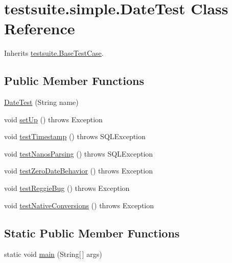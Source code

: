\hypertarget{classtestsuite_1_1simple_1_1_date_test}{}\section{testsuite.\+simple.\+Date\+Test Class Reference}
\label{classtestsuite_1_1simple_1_1_date_test}


Inherits \mbox{\hyperlink{classtestsuite_1_1_base_test_case}{testsuite.\+Base\+Test\+Case}}.

\subsection*{Public Member Functions}
\begin{DoxyCompactItemize}
\item 
\mbox{\hyperlink{classtestsuite_1_1simple_1_1_date_test_a60a505c566e773c02bbbb3110db9f086}{Date\+Test}} (String name)
\item 
void \mbox{\hyperlink{classtestsuite_1_1simple_1_1_date_test_a647fe9ec63530089f263b6e3b11c9416}{set\+Up}} ()  throws Exception 
\item 
void \mbox{\hyperlink{classtestsuite_1_1simple_1_1_date_test_ad5650d68e2ad8f8299ee50582df96fbd}{test\+Timestamp}} ()  throws S\+Q\+L\+Exception 
\item 
void \mbox{\hyperlink{classtestsuite_1_1simple_1_1_date_test_a8ff33660e5f3bef72c6e40dafff29179}{test\+Nanos\+Parsing}} ()  throws S\+Q\+L\+Exception 
\item 
void \mbox{\hyperlink{classtestsuite_1_1simple_1_1_date_test_a65e40a7db246ac9e6d412004a72e4bd4}{test\+Zero\+Date\+Behavior}} ()  throws Exception 
\item 
void \mbox{\hyperlink{classtestsuite_1_1simple_1_1_date_test_a68b7b47868eba16b30f704412bff26a2}{test\+Reggie\+Bug}} ()  throws Exception 
\item 
void \mbox{\hyperlink{classtestsuite_1_1simple_1_1_date_test_a77231bba7d456a9a577452a353b9348e}{test\+Native\+Conversions}} ()  throws Exception 
\end{DoxyCompactItemize}
\subsection*{Static Public Member Functions}
\begin{DoxyCompactItemize}
\item 
static void \mbox{\hyperlink{classtestsuite_1_1simple_1_1_date_test_a1d2bf67257401c0087fbe82d7e7ef0ff}{main}} (String\mbox{[}$\,$\mbox{]} args)
\end{DoxyCompactItemize}
